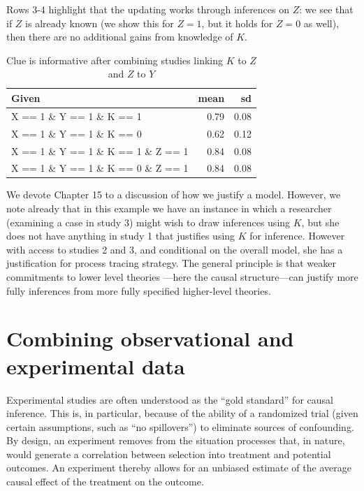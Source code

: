 \documentclass[
  12pt,
]{book}
\begin{document}
Rows 3-4 highlight that the updating works through inferences on \(Z\): we see that if \(Z\) is already known (we show this for \(Z=1\), but it holds for \(Z=0\) as well), then there are no additional gains from knowledge of \(K\).

\begin{table}

\caption{\label{tab:frank4}Clue is informative after combining studies linking $K$ to $Z$ and $Z$ to $Y$}
\centering
\begin{tabular}[t]{l|r|r}
\hline
Given & mean & sd\\
\hline
X == 1 \& Y == 1 \& K == 1 & 0.79 & 0.08\\
\hline
X == 1 \& Y == 1 \& K == 0 & 0.62 & 0.12\\
\hline
X == 1 \& Y == 1 \& K == 1 \& Z == 1 & 0.84 & 0.08\\
\hline
X == 1 \& Y == 1 \& K == 0 \& Z == 1 & 0.84 & 0.08\\
\hline
\end{tabular}
\end{table}

We devote Chapter 15 to a discussion of how we justify a model. However, we note already that in this example we have an instance in which a researcher (examining a case in study 3) might wish to draw inferences using \(K\), but she does not have anything in study 1 that justifies using \(K\) for inference. However with access to studies 2 and 3, and conditional on the overall model, she has a justification for process tracing strategy. The general principle is that weaker commitments to lower level theories ---here the causal structure---can justify more fully inferences from more fully specified higher-level theories.

\hypertarget{combining-observational-and-experimental-data}{%
\section{Combining observational and experimental data}\label{combining-observational-and-experimental-data}}

Experimental studies are often understood as the ``gold standard'' for causal inference. This is, in particular, because of the ability of a randomized trial (given certain assumptions, such as ``no spillovers'') to eliminate sources of confounding. By design, an experiment removes from the situation processes that, in nature, would generate a correlation between selection into treatment and potential outcomes. An experiment thereby allows for an unbiased estimate of the average causal effect of the treatment on the outcome.
\end{document}
